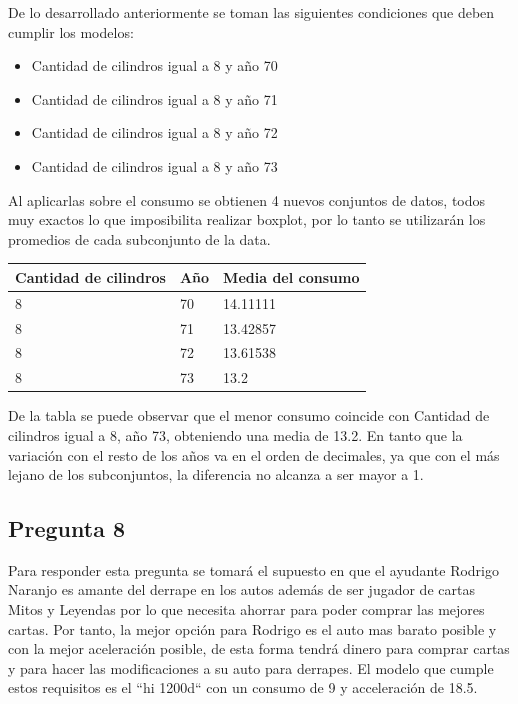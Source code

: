 \documentclass[letter,10pt]{article}
\begin{document}
De lo desarrollado anteriormente se toman las siguientes condiciones que deben cumplir los modelos:
\begin{itemize}
 \item Cantidad de cilindros igual a 8 y año 70
 \item Cantidad de cilindros igual a 8 y año 71
 \item Cantidad de cilindros igual a 8 y año 72
 \item Cantidad de cilindros igual a 8 y año 73
\end{itemize}

Al aplicarlas sobre el consumo se obtienen 4 nuevos conjuntos de datos, todos muy exactos lo que imposibilita realizar boxplot, por lo tanto
se utilizarán los promedios de cada subconjunto de la data.

\begin{table}[h]
    \begin{center}
    \begin{tabular}{|l|l|l|}
    \hline
    Cantidad de cilindros & Año & Media del consumo \\ \hline
    8                     & 70  & 14.11111          \\
    8                     & 71  & 13.42857          \\
    8                     & 72  & 13.61538          \\
    8                     & 73  & 13.2              \\ \hline
    \end{tabular}
    \end{center}
\end{table}

De la tabla se puede observar que el menor consumo coincide con Cantidad de cilindros igual a 8, año 73, obteniendo una media de 13.2. En tanto
que la variación con el resto de los años va en el orden de decimales, ya que con el más lejano de los subconjuntos, la diferencia no alcanza a ser mayor a 1.



\subsection{Pregunta 8}
Para responder esta pregunta se tomará el supuesto en que el ayudante Rodrigo Naranjo es amante del derrape en los autos además de ser jugador de cartas Mitos y Leyendas
por lo que necesita ahorrar para poder comprar las mejores cartas. Por tanto, la mejor opción para Rodrigo es el auto mas barato posible y con la mejor aceleración posible,
de esta forma tendrá dinero para comprar cartas y para hacer las modificaciones a su auto para derrapes. El modelo que cumple
estos requisitos es el ``hi 1200d`` con un consumo de 9 y acceleración de 18.5.
\end{document}
